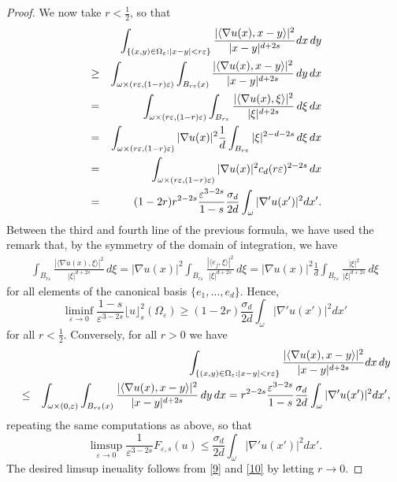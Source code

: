 \documentclass[11pt]{article}
\def\e{\varepsilon}
\begin{document}
\begin{proof}
We now take $r<\frac12$, so that 
\begin{eqnarray*}
&&\hskip-1.5cm\int_{\{(x,y)\in\Omega_\e: |x-y|<r\e\}}\frac{|\langle \nabla u(x), x-y\rangle|^2}{|x-y|^{d+2s}} dx\,dy\\
&\ge &\int_{\omega\times (r\e,(1-r)\e)}\int_{B_{r\e}(x)}\frac{|\langle \nabla u(x), x-y\rangle|^2}{|x-y|^{d+2s}}\,dy\,dx\\
&=&\int_{\omega\times (r\e,(1-r)\e)}\int_{B_{r\e}}\frac{|\langle \nabla u(x), \xi\rangle|^2}{|\xi|^{d+2s}}\,d\xi\,dx\\
&=&\int_{\omega\times (r\e,(1-r)\e)}|\nabla u(x)|^2\frac1d\int_{B_{r\e}}|\xi|^{2-d-2s}\,d\xi\,dx\\
&=&\int_{\omega\times (r\e,(1-r)\e)}|\nabla u(x)|^2c_d(r\e)^{2-2s}\,dx\\
&=&(1-2r)r^{2-2s}\frac{\e^{3-2s}}{1-s}\frac{\sigma_{d}}{2d}\int_{\omega}|\nabla' u(x')|^2dx'.
\end{eqnarray*}
Between the third and fourth line of the previous formula, we have used the remark that, by the symmetry of the domain of integration, we have 
\begin{eqnarray*}
\int_{B_{r\e}}\frac{|\langle \nabla u(x), \xi\rangle|^2}{|\xi|^{d+2s}}\,d\xi=|\nabla u(x)|^2 \int_{B_{r\e}}\frac{|\langle e_j, \xi\rangle|^2}{|\xi|^{d+2s}}\,d\xi
=|\nabla u(x)|^2 \frac1d\int_{B_{r\e}}\frac{|\xi|^2}{|\xi|^{d+2s}}\,d\xi
\end{eqnarray*}
for all elements of the canonical basis $\{e_1,\ldots, e_d\}$.
Hence,
\begin{equation}\label{9}
\liminf_{\e\to 0}\frac{1-s}{\e^{3-2s}}\lfloor u\rfloor_s^2(\Omega_\e)\ge (1-2r)\frac{\sigma_{d}}{2d}\int_{\omega}|\nabla' u(x')|^2dx'
\end{equation}
for all $r<\frac12$. Conversely, for all $r>0$ we have
\begin{eqnarray}\label{a3}\nonumber
&&\hskip-1.5cm\int_{\{(x,y)\in\Omega_\e: |x-y|<r\e\}}\frac{|\langle \nabla u(x), x-y\rangle|^2}{|x-y|^{d+2s}} dx\,dy\\ \nonumber
&\le &\int_{\omega\times (0,\e)}\int_{B_{r\e}(x)}\frac{|\langle \nabla u(x), x-y\rangle|^2}{|x-y|^{d+2s}}\,dy\,dx
=r^{2-2s}\frac{\e^{3-2s}}{1-s}\frac{\sigma_{d}}{2d}\int_{\omega}|\nabla' u(x')|^2dx',
\end{eqnarray}
repeating the same computations as above, so that 
\begin{equation}\label{10}
\limsup_{\e\to 0}\frac{1}{\e^{3-2s}}F_{\e,s}(u)\le \frac{\sigma_{d}}{2d}\int_{\omega}|\nabla' u(x')|^2dx'.
\end{equation}
The desired limsup ineuality follows from \eqref{9} and \eqref{10} by letting $r\to 0$.\end{proof}
\end{document}
